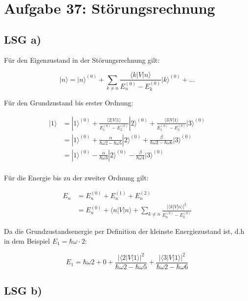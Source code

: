 



\section*{Aufgabe 37: Störungsrechnung}



\subsection*{LSG a)}

Für den Eigenzustand in der Störungsrechnung gilt:

\[ |n\rangle = |n\rangle ^{(0)}+\sum_{k\neq n} \frac{\langle k|V|n\rangle }{E_n^{(0)}- E_k^{(0)}}|k\rangle ^{(0)} + ... \]

Für den Grundzustand bis erster Ordnung:

\begin{align} 
|1\rangle &= |1\rangle ^{(0)}+\frac{\langle 2|V|1\rangle }{E_1^{(0)}- E_2^{(0)}}|2\rangle ^{(0)} +  \frac{\langle 3|V|1\rangle }{E_1^{(0)}- E_3^{(0)}}|3\rangle ^{(0)} \\
&= |1\rangle ^{(0)}+\frac{\alpha }{\hbar\omega 2- \hbar\omega 5}|2\rangle ^{(0)} +  \frac{\beta }{\hbar\omega 2- \hbar\omega 6}|3\rangle ^{(0)} \\
&= |1\rangle ^{(0)}-\frac{\alpha }{\hbar\omega 3}|2\rangle ^{(0)} -  \frac{\beta }{\hbar\omega 4}|3\rangle ^{(0)} \\
\end{align}

Für die Energie bis zu der zweiter Ordnung gilt:

\begin{align}
E_n &= E_n^{(0)}+ E_n^{(1)}+E_n^{(2)} \\
&=E_n^{(0)} + \langle n|V|n\rangle + \sum_{k\neq n}\frac{|\langle
  k|V|n\rangle|^2}{E_n^{(0)}- E_k^{(0)}}
\end{align}

Da die Grundzustandsenergie per Definition der kleinste Energiezustand ist, d.h in dem Beispiel \(E_1=\hbar\omega\cdot 2\):


\[E_1 = \hbar\omega 2 + 0 +  \frac{|\langle 2|V|1\rangle|^2}{\hbar\omega 2
  -\hbar\omega 5  } + \frac{|\langle 3|V|1\rangle|^2}{\hbar\omega 2
  -\hbar\omega 6  } \]



\subsection*{LSG b)}





